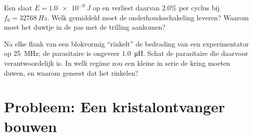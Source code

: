 \begin{exercise}[$\star\star\star$]\label{exo:g12:rlc-oscillations:14}
Een  slaat $E = \qty{1.0e-9}{J}$ op en verliest daarvan
$2.0\%$ per cyclus bij $f_0 = \qty{32768}{Hz}$. Welk gemiddeld  moet
de onderhoudsschakeling leveren? Waarom moet het duwtje in de pas met de
trilling aankomen?
\end{exercise}

\begin{exercise}[$\star\star\star$]\label{exo:g12:rlc-oscillations:15}
Na elke flank van een blokvormig  ``rinkelt'' de bedrading van een
experimentator op \qty{25}{MHz}; de parasitaire  is ongeveer
\qty{1.0}{\micro H}. Schat de parasitaire  die daarvoor verantwoordelijk
is. In welk regime zou een kleine  in serie de kring moeten duwen, en
waarom geneest dat het rinkelen?
\end{exercise}

\section{Probleem: Een kristalontvanger bouwen}

